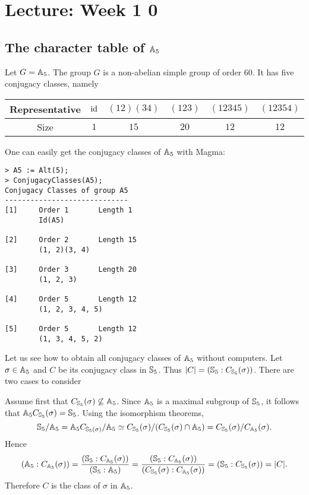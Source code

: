 \section{Lecture: Week 1
0}

\subsection{The character table of \texorpdfstring{$\mathbb{A}_5$}{A5}}

Let $G=\mathbb{A}_5$. 
The group $G$ is a non-abelian simple group of order 60. It has five conjugacy classes, namely

\bigskip 
\begin{center}
    \begin{tabular}{c|ccccc}
         Representative & $\operatorname{id}$  & $(12)(34)$ & $(123)$  & $(12345)$ & $(12354)$\\
         \hline 
         Size & $1$ & $15$ & $20$ & $12$ & $12$ \\
    \end{tabular}
\end{center}
\bigskip 

One can easily get the conjugacy classes of 
$\mathbb{A}_5$ with Magma:
\begin{lstlisting}
> A5 := Alt(5);
> ConjugacyClasses(A5);
Conjugacy Classes of group A5
-----------------------------
[1]     Order 1       Length 1
        Id(A5)

[2]     Order 2       Length 15
        (1, 2)(3, 4)

[3]     Order 3       Length 20
        (1, 2, 3)

[4]     Order 5       Length 12
        (1, 2, 3, 4, 5)

[5]     Order 5       Length 12
        (1, 3, 4, 5, 2)    
\end{lstlisting}

Let us see how to obtain all conjugacy classes
of $\mathbb{A}_5$ without computers. Let $\sigma\in\mathbb{A}_5$ and $C$ be its
conjugacy class in $\mathbb{S}_5$. Thus $|C|=(\mathbb{S}_5:C_{\mathbb{S}_5}(\sigma))$. There are two cases to consider

Assume first that $C_{\mathbb{S}_5}(\sigma)\not\subseteq\mathbb{A}_5$. Since $\mathbb{A}_5$ is a maximal subgroup of $\mathbb{S}_5$, it follows that 
$\mathbb{A}_5C_{\mathbb{S}_5}(\sigma)=\mathbb{S}_5$. Using the isomorphism theorems, 
\[
\mathbb{S}_5/\mathbb{A}_5=\mathbb{A}_5C_{\mathbb{S}_5(\sigma)}/\mathbb{A}_5
\simeq C_{\mathbb{S}_5}(\sigma)/(C_{\mathbb{S}_5}(\sigma)\cap\mathbb{A}_5)
=C_{\mathbb{S}_5}(\sigma)/C_{\mathbb{A}_5}(\sigma).
\]
Hence 
\[
(\mathbb{A}_5:C_{\mathbb{A}_5}(\sigma))=\frac{(\mathbb{S}_5:C_{\mathbb{A}_5}(\sigma))}{(\mathbb{S}_5:\mathbb{A}_5)}
=\frac{(\mathbb{S}_5:C_{\mathbb{A}_5}(\sigma))}{(C_{\mathbb{S}_5}(\sigma):C_{\mathbb{A}_5}(\sigma))}
=(\mathbb{S}_5:C_{\mathbb{S}_5}(\sigma))=|C|.
\]
Therefore $C$ is the class of $\sigma$ in $\mathbb{A}_5$. 

